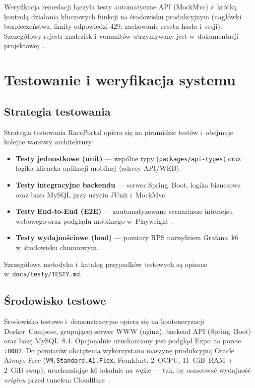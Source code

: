 \documentclass{sprz}
\begin{document}
Weryfikacja remedacji łączyła testy automatyczne API (MockMvc) z~krótką kontrolą działania kluczowych funkcji na środowisku produkcyjnym (nagłówki bezpieczeństwa, limity odpowiedzi 429, zachowanie resetu hasła i~sesji). Szczegółowy rejestr znalezisk i~commitów utrzymywany jest w~dokumentacji projektowej~\cite{raceportal:pentest}.

\chapter{Testowanie i weryfikacja systemu}
\label{ch:testy}
\section{Strategia testowania}
Strategia testowania RacePortal opiera się na piramidzie testów i~obejmuje kolejne warstwy architektury:
\begin{itemize}
  \item \textbf{Testy jednostkowe (unit)} --- wspólne typy (\texttt{packages/api-types}) oraz logika kliencka aplikacji mobilnej (adresy API/WEB).
  \item \textbf{Testy integracyjne backendu} --- serwer Spring~Boot, logika biznesowa oraz baza MySQL przy użyciu JUnit i~MockMvc.
  \item \textbf{Testy End-to-End (E2E)} --- zautomatyzowane scenariusze interfejsu webowego oraz podglądu mobilnego w~Playwright~\cite{playwright:docs}.
  \item \textbf{Testy wydajnościowe (load)} --- pomiary RPS narzędziem Grafana~k6~\cite{k6:docs} w~środowisku chmurowym.
\end{itemize}
Szczegółowa metodyka i~katalog przypadków testowych są opisane w~\texttt{docs/\allowbreak testy/\allowbreak TESTY.md}.

\section{Środowisko testowe}
Środowisko testowe i~demonstracyjne opiera się na konteneryzacji Docker~Compose, grupującej serwer WWW (nginx), backend API (Spring~Boot) oraz bazę MySQL~8.4. Opcjonalnie uruchamiany jest podgląd Expo na porcie \texttt{:8082}. Do pomiarów obciążenia wykorzystano maszynę produkcyjną Oracle Always Free (\texttt{VM.Standard.A1.Flex}, Frankfurt: 2~OCPU, 11~GiB~RAM + 2~GiB swap), uruchamiając k6 lokalnie na węźle --- tak, by oszacować wydajność \emph{originu} przed tunelem Cloudflare~\cite{k6:vm-rps}.
\end{document}
